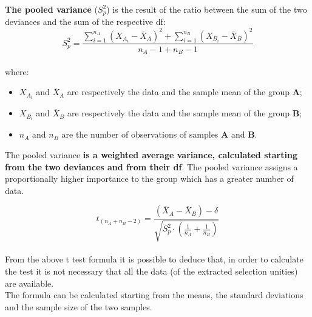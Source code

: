 \begin{frame}
  \begin{small}
    \textbf{The pooled variance} ({\boldmath$ S^2_p $}) is the result of the ratio between the sum of the two deviances and the sum of the respective df:\\
    \vspace*{.25cm}
    $$ S^2_p = \frac{\sum_{i=1}^{n_A}{(X_{A_i}-\overline{X}_A)^2}+\sum_{i=1}^{n_B}{(X_{B_i}-\overline{X}_B)^2}}{n_A-1+n_B-1} $$\\
    \vspace*{.25cm}
    where:
    \begin{itemize}
      \item $ X_{A_i} $ and $ \overline{X}_A $ are respectively the data and the sample mean of the group \textbf{A};
      \item $ X_{B_i} $ and $ \overline{X}_B $ are respectively the data and the sample mean of the group \textbf{B};
      \item $ n_A $ and $ n_B $ are the number of observations of samples \textbf{A} and \textbf{B}.
    \end{itemize}
    \vspace*{.25cm}
    The pooled variance \textbf{is a weighted average variance, calculated starting from the two deviances and from their df}. The pooled variance assigns a proportionally higher importance to the group which has a greater number of data.
  \end{small}
\end{frame}

\begin{frame}
  \vspace*{.25cm}
  $$ t_{(n_A+n_B-2)} = \frac{(\overline{X}_A-\overline{X}_B)-\delta}{\sqrt{S^2_p \cdot (\frac{1}{n_A}+\frac{1}{n_B})}} $$\\
  \vspace*{.25cm}
  From the above t test formula it is possible to deduce that, in order to calculate the test it is not necessary that all the data (of the extracted selection unities) are available.\\
  \vspace*{.5cm}
  The formula can be calculated starting from the means, the standard deviations and the sample size of the two samples.
\end{frame}




